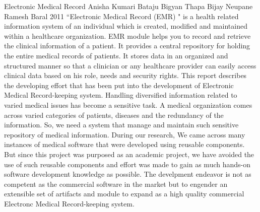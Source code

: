  \begin{conf-abstract}[]
{Electronic Medical Record}
{ Anisha Kumari Bataju
Bigyan Thapa
Bijay Neupane
Ramesh Baral
}
{2011}
``Electronic Medical Record (EMR) " is a health related information system of an individual which is created, modified and maintained within a healthcare organization. EMR module helps you to record and retrieve the clinical information of a patient. It provides a central repository for holding the entire medical records of patients. It stores data in an organized and structured manner so that a clinician or any healthcare provider can easily access clinical data based on his role, needs and security rights.
This report describes the developing effort that has been put into the development of Electronic Medical Record-keeping system. Handling diversified information related to varied medical issues has become a sensitive task.
A medical organization comes across varied categories of patients, diseases and the redundancy of the information. So, we need a system that manage and maintain such sensitive repository of medical information.
During our research, We came across many instances of medical software that were developed using reusable components. But since this project was purposed as an academic project, we have avoided the use of such reusable components and effort was made  to gain as much hands-on software development knowledge as possible. The develpment endeavor is not as competent as the commercial software in the market but to engender an extensible set of artifacts and module to expand as a high quality commercial  Electronc Medical Record-keeping system.
  \end{conf-abstract}